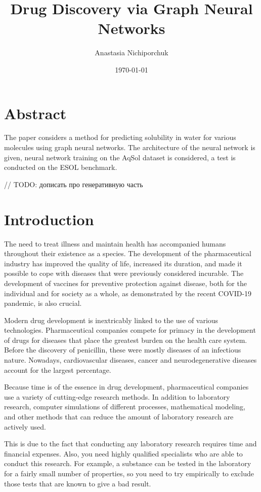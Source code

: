 \documentclass[a4paper,14pt]{article}
\author{Anastasia Nichiporchuk}
\title{Drug Discovery via Graph Neural Networks}
\date{\today}
\begin{document}

\maketitle

\section*{Abstract}
The paper considers a method for predicting solubility in water for various molecules using graph neural networks. The architecture of the neural network is given, neural network training on the AqSol dataset is considered, a test is conducted on the ESOL benchmark.

// TODO: дописать про генеративную часть

\section{Introduction}\label{1}

The need to treat illness and maintain health has accompanied humans throughout their existence as a species. The development of the pharmaceutical industry has improved the quality of life, increased its duration, and made it possible to cope with diseases that were previously considered incurable. The development of vaccines for preventive protection against disease, both for the individual and for society as a whole, as demonstrated by the recent COVID-19 pandemic, is also crucial. 

Modern drug development is inextricably linked to the use of various technologies. Pharmaceutical companies compete for primacy in the development of drugs for diseases that place the greatest burden on the health care system. Before the discovery of penicillin, these were mostly diseases of an infectious nature. Nowadays, cardiovascular diseases, cancer and neurodegenerative diseases account for the largest percentage.

Because time is of the essence in drug development, pharmaceutical companies use a variety of cutting-edge research methods. In addition to laboratory research, computer simulations of different processes, mathematical modeling, and other methods that can reduce the amount of laboratory research are actively used. 


This is due to the fact that conducting any laboratory research requires time and financial expenses. Also, you need highly qualified specialists who are able to conduct this research. For example, a substance can be tested in the laboratory for a fairly small number of properties, so you need to try empirically to exclude those tests that are known to give a bad result.
\end{document}
